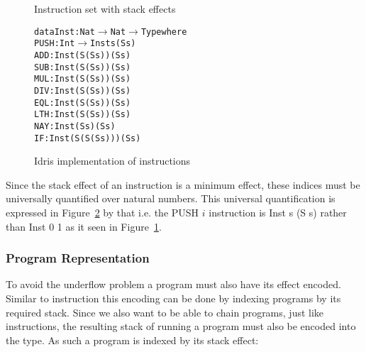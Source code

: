 \begin{figure}
\caption{Instruction set with stack effects}
\label{fig:inst_set_with_effect}
\end{figure}

\begin{figure}
\begin{alltt}
data Inst : Nat \(\rightarrow\) Nat \(\rightarrow\) Type where
  PUSH : Int \(\rightarrow\) Inst          s    (S s)
  ADD  :        Inst    (S (S s))  (S s)
  SUB  :        Inst    (S (S s))  (S s)
  MUL  :        Inst    (S (S s))  (S s)
  DIV  :        Inst    (S (S s))  (S s)
  EQL  :        Inst    (S (S s))  (S s)
  LTH  :        Inst    (S (S s))  (S s)
  NAY  :        Inst       (S s)   (S s)
  IF   :        Inst (S (S (S s))) (S s)
\end{alltt}
\caption{Idris implementation of instructions}
\label{fig:idris_inst_set}
\end{figure}

Since the stack effect of an instruction is a minimum effect, these indices must be universally quantified over natural numbers. This universal quantification is expressed in Figure~\ref{fig:idris_inst_set} by that i.e. the PUSH $i$ instruction is Inst s (S s) rather than Inst 0 1 as it seen in Figure~\ref{fig:inst_set_with_effect}. 

\subsubsection{Program Representation}
To avoid the underflow problem a program must also have its effect encoded. Similar to instruction this encoding can be done by indexing programs by its required stack. Since we also want to be able to chain programs, just like instructions, the resulting stack of running a program must also be encoded into the type. As such a program is indexed by its stack effect:

